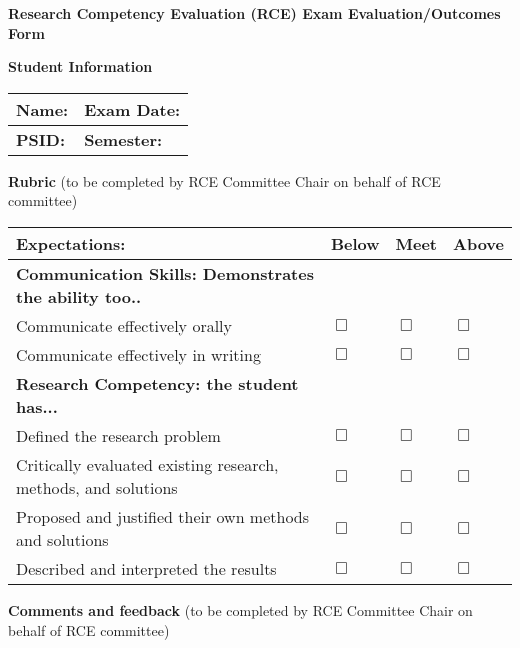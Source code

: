 \documentclass{article}
\begin{document}
\begin{center}
    \textbf{\Large Research Competency Evaluation (RCE) Exam Evaluation/Outcomes Form} 
\end{center}
\vspace{2em}

\noindent\textbf{Student Information}\\[0.5em]


\noindent\renewcommand{\arraystretch}{1.5}
\begin{tabular}{|p{7cm}|p{6cm}|}
    \hline
    \textbf{Name:} & \textbf{Exam Date: } \\ 
    \hline
    \textbf{PSID:} & \textbf{Semester:} \\
    \hline
\end{tabular}
\vspace{2em}

\noindent\textbf{Rubric} {(to be completed by RCE Committee Chair on behalf of RCE committee)}


\renewcommand{\arraystretch}{1.5}
\noindent\begin{tabular}{|l|p{1cm}|p{1cm}|p{1cm}|}
    \hline
    \textbf{Expectations:} & \textbf{Below } & \textbf{Meet} & \textbf{Above} \\
    \hline
    \textbf{Communication Skills: Demonstrates the ability too..} & { } & { } & { } \\
    \hline
    Communicate effectively orally & $\Box$ & $\Box$ & $\Box$ \\
    \hline
    Communicate effectively in writing & $\Box$ & $\Box$ & $\Box$ \\
    \hline
    \textbf{Research Competency: the student has...} & { } & { } & { } \\
    \hline
    Defined the research problem & $\Box$ & $\Box$ & $\Box$ \\
    \hline
    Critically evaluated existing research, methods, and solutions & $\Box$ & $\Box$ & $\Box$ \\
    \hline
    Proposed and justified their own methods and solutions & $\Box$ & $\Box$ & $\Box$ \\
    \hline
    Described and interpreted the results & $\Box$ & $\Box$ & $\Box$ \\
    \hline
\end{tabular}

\vspace{2em}

\noindent\textbf{Comments and feedback} {(to be completed by RCE Committee Chair on behalf of RCE committee)}
\end{document}

